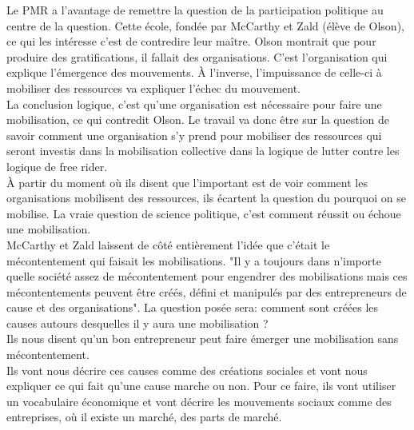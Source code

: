 \documentclass[10pt, a4paper, openany]{book}
\begin{document}
Le PMR a l'avantage de remettre la question de la participation politique au centre de la question. Cette école, fondée par McCarthy et Zald (élève de Olson), ce qui les intéresse c'est de contredire leur maître. Olson montrait que pour produire des gratifications, il fallait des organisations. C'est l'organisation qui explique l'émergence des mouvements. À l'inverse, l'impuissance de celle-ci à mobiliser des ressources va expliquer l'échec du mouvement. \\
La conclusion logique, c'est qu'une organisation est nécessaire pour faire une mobilisation, ce qui contredit Olson. Le travail va donc être sur la question de savoir comment une organisation s'y prend pour mobiliser des ressources qui seront investis dans la mobilisation collective dans la logique de lutter contre les logique de free rider. \\
À partir du moment où ils disent que l'important est de voir comment les organisations mobilisent des ressources, ils écartent la question du pourquoi on se mobilise. La vraie question de science politique, c'est comment réussit ou échoue une mobilisation. \\
McCarthy et Zald laissent de côté entièrement l'idée que c'était le mécontentement qui faisait les mobilisations. "Il y a toujours dans n'importe quelle société assez de mécontentement pour engendrer des mobilisations mais ces mécontentements peuvent être créés, défini et manipulés par des entrepreneurs de cause et des organisations". La question posée sera: comment sont créées les causes autours desquelles il y aura une mobilisation ? \\
Ils nous disent qu'un bon entrepreneur peut faire émerger une mobilisation sans mécontentement. \\
Ils vont nous décrire ces causes comme des créations sociales et vont nous expliquer ce qui fait qu'une cause marche ou non. Pour ce faire, ils vont utiliser un vocabulaire économique et vont décrire les mouvements sociaux comme des entreprises, où il existe un marché, des parts de marché. 
\end{document}
